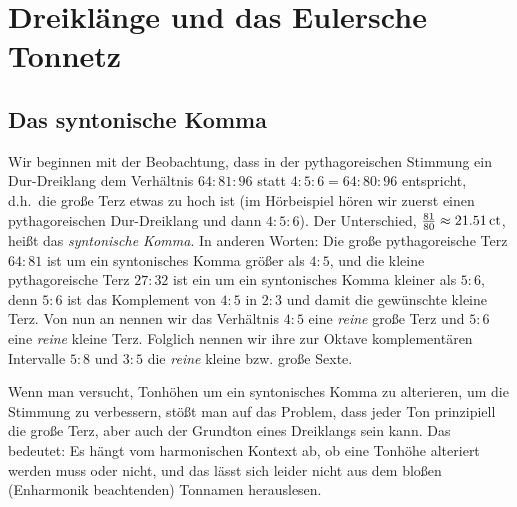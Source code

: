 \documentclass[ngerman,11pt]{scrartcl}
\begin{document}

\section{Dreiklänge und das Eulersche Tonnetz}
\label{sec:tri}

\subsection{Das syntonische Komma}

Wir beginnen mit der Beobachtung, dass in der pythagoreischen Stimmung ein
Dur-Dreiklang dem Verhältnis $64:81:96$ statt $4:5:6=64:80:96$ entspricht,
d.h.\ die große Terz etwas zu hoch ist (im Hörbeispiel hören wir zuerst einen
pythagoreischen Dur-Dreiklang und dann $4:5:6$). Der Unterschied,
$\frac{81}{80}\approx 21.51\,\mathrm{ct}$, heißt das
\emph{syntonische Komma}.
In anderen Worten: Die große pythagoreische Terz $64:81$ ist um ein syntonisches
Komma größer als $4:5$, und die kleine pythagoreische Terz $27:32$ ist ein um
ein syntonisches Komma kleiner als $5:6$, denn $5:6$ ist das Komplement von
$4:5$ in $2:3$ und damit die gewünschte kleine Terz. Von nun an nennen wir das
Verhältnis $4:5$ eine \emph{reine} große Terz und $5:6$ eine \emph{reine} kleine
Terz. Folglich nennen wir ihre zur Oktave komplementären Intervalle $5:8$ und
$3:5$ die \emph{reine} kleine bzw. große Sexte.

Wenn man versucht, Tonhöhen um ein syntonisches Komma zu alterieren, um die
Stimmung zu verbessern, stößt man auf das Problem, dass jeder Ton prinzipiell
die große Terz, aber auch der Grundton eines Dreiklangs sein kann. Das bedeutet:
Es hängt vom harmonischen Kontext ab, ob eine Tonhöhe alteriert werden muss
oder nicht, und das lässt sich leider nicht aus dem bloßen (Enharmonik
beachtenden) Tonnamen herauslesen.
\end{document}
